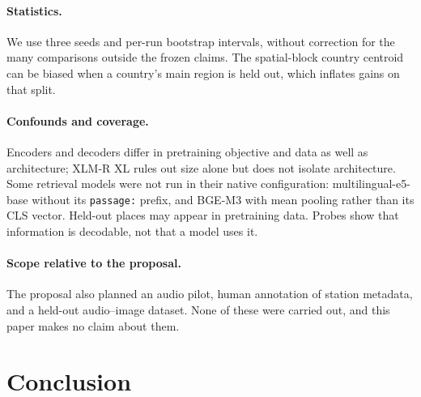 \paragraph{Statistics.}
We use three seeds and per-run bootstrap intervals, without correction for the many comparisons outside the frozen claims. The spatial-block country centroid can be biased when a country's main region is held out, which inflates gains on that split.

\paragraph{Confounds and coverage.}
Encoders and decoders differ in pretraining objective and data as well as architecture; XLM-R XL rules out size alone but does not isolate architecture. Some retrieval models were not run in their native configuration: multilingual-e5-base without its \texttt{passage:} prefix, and BGE-M3 with mean pooling rather than its CLS vector. Held-out places may appear in pretraining data. Probes show that information is decodable, not that a model uses it.

\paragraph{Scope relative to the proposal.}
The proposal also planned an audio pilot, human annotation of station metadata, and a held-out audio--image dataset. None of these were carried out, and this paper makes no claim about them.

\section{Conclusion}
\label{sec:conclusion}

